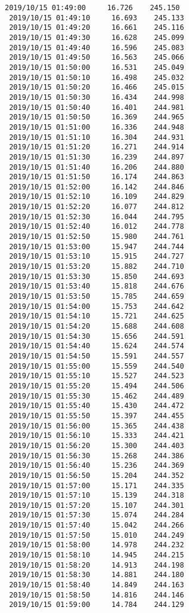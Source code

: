 \documentclass[11pt]{article}
\begin{document}
\begin{Verbatim}[commandchars=\\\{\}]
 2019/10/15 01:49:00     16.726    245.150
 2019/10/15 01:49:10     16.693    245.133
 2019/10/15 01:49:20     16.661    245.116
 2019/10/15 01:49:30     16.628    245.099
 2019/10/15 01:49:40     16.596    245.083
 2019/10/15 01:49:50     16.563    245.066
 2019/10/15 01:50:00     16.531    245.049
 2019/10/15 01:50:10     16.498    245.032
 2019/10/15 01:50:20     16.466    245.015
 2019/10/15 01:50:30     16.434    244.998
 2019/10/15 01:50:40     16.401    244.981
 2019/10/15 01:50:50     16.369    244.965
 2019/10/15 01:51:00     16.336    244.948
 2019/10/15 01:51:10     16.304    244.931
 2019/10/15 01:51:20     16.271    244.914
 2019/10/15 01:51:30     16.239    244.897
 2019/10/15 01:51:40     16.206    244.880
 2019/10/15 01:51:50     16.174    244.863
 2019/10/15 01:52:00     16.142    244.846
 2019/10/15 01:52:10     16.109    244.829
 2019/10/15 01:52:20     16.077    244.812
 2019/10/15 01:52:30     16.044    244.795
 2019/10/15 01:52:40     16.012    244.778
 2019/10/15 01:52:50     15.980    244.761
 2019/10/15 01:53:00     15.947    244.744
 2019/10/15 01:53:10     15.915    244.727
 2019/10/15 01:53:20     15.882    244.710
 2019/10/15 01:53:30     15.850    244.693
 2019/10/15 01:53:40     15.818    244.676
 2019/10/15 01:53:50     15.785    244.659
 2019/10/15 01:54:00     15.753    244.642
 2019/10/15 01:54:10     15.721    244.625
 2019/10/15 01:54:20     15.688    244.608
 2019/10/15 01:54:30     15.656    244.591
 2019/10/15 01:54:40     15.624    244.574
 2019/10/15 01:54:50     15.591    244.557
 2019/10/15 01:55:00     15.559    244.540
 2019/10/15 01:55:10     15.527    244.523
 2019/10/15 01:55:20     15.494    244.506
 2019/10/15 01:55:30     15.462    244.489
 2019/10/15 01:55:40     15.430    244.472
 2019/10/15 01:55:50     15.397    244.455
 2019/10/15 01:56:00     15.365    244.438
 2019/10/15 01:56:10     15.333    244.421
 2019/10/15 01:56:20     15.300    244.403
 2019/10/15 01:56:30     15.268    244.386
 2019/10/15 01:56:40     15.236    244.369
 2019/10/15 01:56:50     15.204    244.352
 2019/10/15 01:57:00     15.171    244.335
 2019/10/15 01:57:10     15.139    244.318
 2019/10/15 01:57:20     15.107    244.301
 2019/10/15 01:57:30     15.074    244.284
 2019/10/15 01:57:40     15.042    244.266
 2019/10/15 01:57:50     15.010    244.249
 2019/10/15 01:58:00     14.978    244.232
 2019/10/15 01:58:10     14.945    244.215
 2019/10/15 01:58:20     14.913    244.198
 2019/10/15 01:58:30     14.881    244.180
 2019/10/15 01:58:40     14.849    244.163
 2019/10/15 01:58:50     14.816    244.146
 2019/10/15 01:59:00     14.784    244.129

\end{Verbatim}
\end{document}
